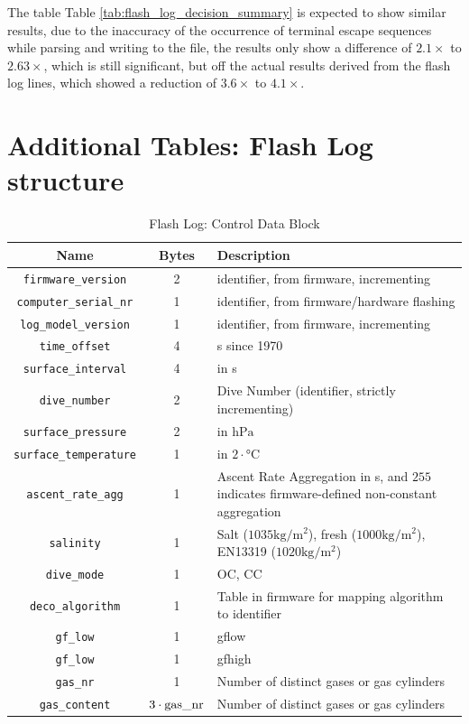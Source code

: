 The table Table \ref{tab:flash_log_decision_summary} is expected to show similar results, due to the inaccuracy of the occurrence of terminal escape sequences while parsing and writing to the file, the results only show a difference of $2.1\times$ to $2.63\times$, which is still significant, but off the actual results derived from the flash log lines, which showed a reduction of $3.6\times$ to $4.1\times$.


\chapter{Additional Tables: Flash Log structure}
\begin{table}[htbp]
  \centering
  \label{tab:log-control}
  \begin{tabularx}{\textwidth}{|c|c|X|}
    \hline
    Name & Bytes & Description \\
    \hline
    \lstinline{firmware_version} & 2 & identifier, from firmware, incrementing \\
    \hline
    \lstinline{computer_serial_nr} & 1 & identifier, from firmware/hardware flashing \\
    \hline
    \lstinline{log_model_version} & 1 & identifier, from firmware, incrementing \\
    \hline
    \lstinline{time_offset} & 4 & \si{\second} since 1970 \\
    \hline
    \lstinline{surface_interval} & 4 & in \si{\second} \\
    \hline
    \lstinline{dive_number} & 2 & Dive Number (identifier, strictly incrementing) \\
    \hline
    \lstinline{surface_pressure} & 2 & in $\si{\hecto\Pa}$ \\
    \hline
    \lstinline{surface_temperature} & 1 & in $2 \cdot \si{\celsius}$ \\
    \hline
    \lstinline{ascent_rate_agg} & 1 & Ascent Rate Aggregation in \si{\second}, and $255$ indicates firmware-defined non-constant aggregation \\
    \hline
    \lstinline{salinity} & 1 & Salt ($1035 \si{\kg/\m^2}$), fresh ($1000 \si{\kg/\m^2}$), EN13319 ($1020 \si{\kg/\m^2}$) \\
    \hline
    \lstinline{dive_mode} & 1 & OC, CC \\
    \hline
    \lstinline{deco_algorithm} & 1 & Table in firmware for mapping algorithm to identifier \\
    \hline
    \lstinline{gf_low} & 1 & \gls{gflow} \\
    \hline
    \lstinline{gf_low} & 1 & \gls{gfhigh} \\
    \hline
    \lstinline{gas_nr} & 1 & Number of distinct gases or gas cylinders \\
    \hline
    \lstinline{gas_content} & $3 \cdot \lstinline{gas_nr}$ & Number of distinct gases or gas cylinders \\
    \hline
  \end{tabularx}
  \caption{Flash Log: Control Data Block}
\end{table}

